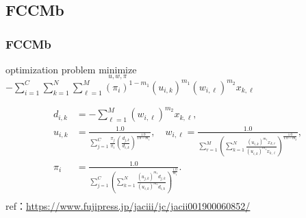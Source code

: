 \documentclass[fleqn,dvipdfmx,10pt]{beamer}
\begin{document}
\subsection{FCCMb}
\begin{frame}\frametitle{FCCMb}%
  \begin{block}{optimization problem}
    $\underset{u,w,\pi}{\text{minimize}}$
    $-\sum_{i=1}^C\sum_{k=1}^N\sum_{\ell=1}^M(\pi_i)^{1-{m_1}}(u_{i,k})^{m_1}(w_{i,\ell})^{m_2}x_{k,\ell}$
  \end{block}
  \begin{align*}
    d_{i,k}&=-\sum_{\ell=1}^M(w_{i,\ell})^{m_2}x_{k,\ell},\\
    u_{i,k}&=\frac{1.0}{\sum_{j=1}^C\frac{\pi_{j}}{\pi_{i}}\left(\frac{d_{j,k}}{d_{i,k}}\right)^\frac{1.0}{1.0-{m_1}}},\quad
    w_{i,\ell}=\frac{1.0}{\sum_{r=1}^M\left(\sum_{k=1}^N\frac{(u_{i,k})^{m_1}x_{k,r}}{(u_{i,k})^{m_1}x_{k,\ell}}\right)^{\frac{1.0}{1.0-{m_2}}}}, \\
    \pi_{i}&=\frac{1.0}{\sum_{j=1}^C\left(\sum_{k=1}^N\frac{(u_{j,k})^{m_1}d_{j,k}}{(u_{i,k})^{m_1}d_{i,k}}\right)^{\frac{1.0}{m_1}}}.\\
  \end{align*}
  ref：\url{https://www.fujipress.jp/jaciii/jc/jacii001900060852/}\centering
\end{frame}
\end{document}
